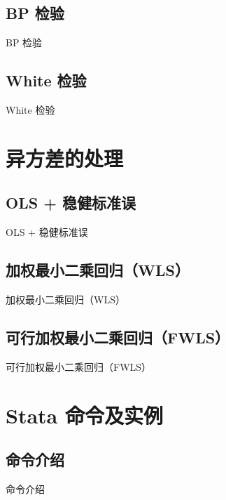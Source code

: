 \documentclass[UTF8]{ctexbeamer}
\begin{document}
\subsection{ BP 检验}
\begin{frame}{ BP 检验}
\end{frame}

\subsection{ White 检验}
\begin{frame}{ White 检验}
\end{frame}

\section{异方差的处理}
\subsection{OLS + 稳健标准误}
\begin{frame}{OLS + 稳健标准误}
\end{frame}

\subsection{加权最小二乘回归（WLS）}
\begin{frame}{加权最小二乘回归（WLS）}
\end{frame}

\subsection{可行加权最小二乘回归（FWLS）}
\begin{frame}{可行加权最小二乘回归（FWLS）}
\end{frame}

\section{ Stata 命令及实例}
\subsection{命令介绍}
\begin{frame}{命令介绍}
\end{frame}
\end{document}
